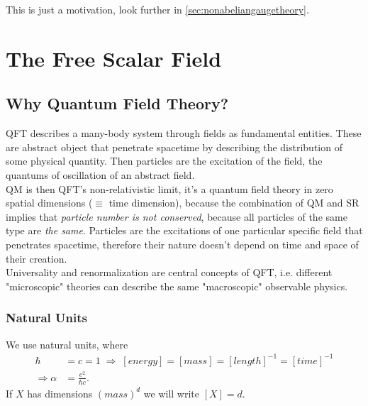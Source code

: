 This is just a motivation, look further in \ref{sec:nonabeliangaugetheory}.






































\section{The Free Scalar Field}
\subsection{Why Quantum Field Theory?}
QFT describes a many-body system through fields as fundamental entities. These are abstract object that penetrate spacetime by describing the distribution of some physical quantity. Then particles are the excitation of the field, the quantums of oscillation of an abstract field.\\
QM is then QFT's non-relativistic limit, it's a quantum field theory in zero spatial dimensions ($\equiv$ time dimension),
because the combination of QM and SR implies that \emph{particle number is not conserved}, because all particles of the same type are \emph{the same}. Particles are the excitations of one particular specific field that penetrates spacetime, therefore their nature doesn't depend on time and space of their creation.\\
Universality and renormalization are central concepts of QFT, i.e. different "microscopic" theories can describe the same "macroscopic" observable physics.
\subsubsection{Natural Units}
We use natural units, where 
\begin{align*}
	\hbar &= c = 1 \; \Rightarrow \; [energy]=[mass]=[length]^{-1}=[time]^{-1} \\
	\Rightarrow \alpha &= \frac{e^2}{\hbar c}.
\end{align*}
If $X$ has dimensions $(mass)^d$ we will write $[X]=d$.


